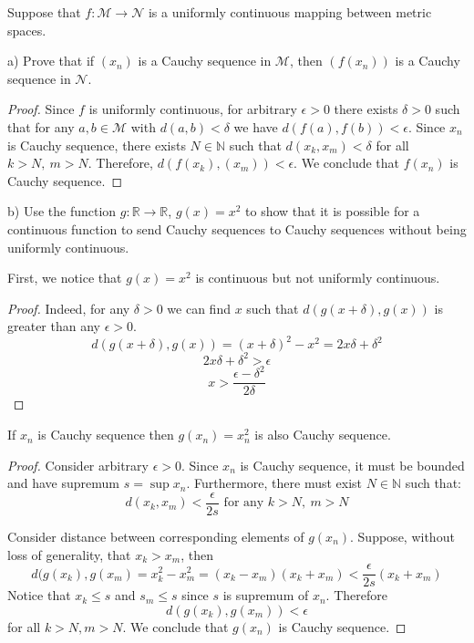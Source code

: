 \documentclass{article}
\begin{document}
\begin{tcolorbox}
Suppose that $f : \mathcal{M} \to \mathcal{N}$ is a uniformly continuous mapping between metric spaces.

a) Prove that if $(x_n)$ is a Cauchy sequence in $\mathcal{M}$, then $(f (x_n))$ is a Cauchy sequence in $\mathcal{N}$.
\end{tcolorbox}
\begin{proof}
Since $f$ is uniformly continuous, for arbitrary $\epsilon>0$ there exists $\delta>0$ such that for any $a,b \in \mathcal{M}$ with $d(a,b)<\delta$ we have $d(f(a),f(b))<\epsilon$. Since $x_n$ is Cauchy sequence, there exists $N\in\mathbb{N}$ such that $d(x_k, x_m) < \delta$ for all $k>N, \>m>N$. Therefore, $d(f(x_k), (x_m)) < \epsilon$. We conclude that $f(x_n)$ is Cauchy sequence.
\end{proof}

\begin{tcolorbox}
b) Use the function $g : \mathbb{R} \to \mathbb{R}$, $g(x) = x^2$ to show that it is possible for a continuous function to send Cauchy sequences to Cauchy sequences without being uniformly continuous.
\end{tcolorbox}
First, we notice that $g(x)=x^2$ is continuous but not uniformly continuous. 
\begin{proof}
Indeed, for any $\delta>0$ we can find $x$ such that $d(g(x+\delta),g(x))$ is greater than any $\epsilon > 0$.
$$ d(g(x+\delta),g(x)) = (x+\delta)^2 - x^2 = 2x\delta + \delta^2 $$
$$ 2x\delta + \delta^2 > \epsilon $$
$$ x > \frac{\epsilon -\delta^2}{2\delta} $$
\end{proof}
If $x_n$ is Cauchy sequence then $g(x_n)=x_n^2$ is also Cauchy sequence.
\begin{proof}

Consider arbitrary $\epsilon > 0$. Since $x_n$ is Cauchy sequence, it must be bounded and have supremum $s = \sup x_n$. Furthermore, there must exist $N \in \mathbb{N}$ such that:
$$ d(x_k, x_m) < \frac{\epsilon}{2s} \text{ for any } k > N, \> m > N $$

Consider distance between corresponding elements of $g(x_n)$. Suppose, without loss of generality, that $x_k > x_m$, then
$$ d (g(x_k), g(x_m) = x_k^2 - x_m^2 = (x_k - x_m) (x_k + x_m) <  \frac{\epsilon}{2s} (x_k+x_m) $$
Notice that $x_k \leq s$ and $s_m \leq s$ since $s$ is supremum of $x_n$. Therefore
$$ d (g(x_k), g(x_m)) < \epsilon $$
for all $k > N, m > N$. We conclude that $g(x_n)$ is Cauchy sequence.

\end{proof}
\end{document}
